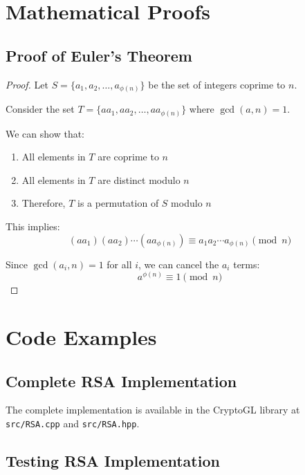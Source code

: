 \documentclass[11pt,a4paper]{article}
\begin{document}
\appendix

\section{Mathematical Proofs}

\subsection{Proof of Euler's Theorem}

\begin{proof}
Let $S = \{a_1, a_2, \ldots, a_{\phi(n)}\}$ be the set of integers coprime to $n$.

Consider the set $T = \{aa_1, aa_2, \ldots, aa_{\phi(n)}\}$ where $\gcd(a,n) = 1$.

We can show that:
\begin{enumerate}
    \item All elements in $T$ are coprime to $n$
    \item All elements in $T$ are distinct modulo $n$
    \item Therefore, $T$ is a permutation of $S$ modulo $n$
\end{enumerate}

This implies:
$$(aa_1)(aa_2)\cdots(aa_{\phi(n)}) \equiv a_1a_2\cdots a_{\phi(n)} \pmod{n}$$

Since $\gcd(a_i, n) = 1$ for all $i$, we can cancel the $a_i$ terms:
$$a^{\phi(n)} \equiv 1 \pmod{n}$$
\end{proof}

\section{Code Examples}

\subsection{Complete RSA Implementation}

The complete implementation is available in the CryptoGL library at \texttt{src/RSA.cpp} and \texttt{src/RSA.hpp}.

\subsection{Testing RSA Implementation}
\end{document}
